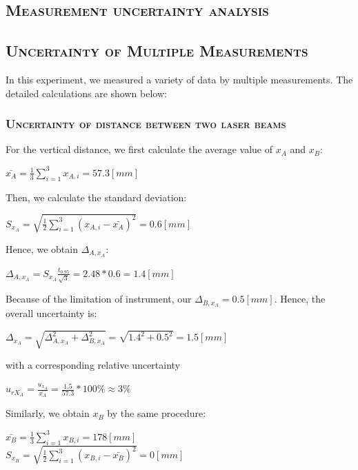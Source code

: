 \documentclass[a4paper,12pt]{article}
\begin{document}
\begin{appendices} 
      \section{\textsc{Measurement uncertainty analysis}} 
      \subsection{\textsc{Uncertainty of Multiple Measurements}}
      In this experiment, we measured a variety of data by multiple measurements. The detailed calculations are shown below:
      \subsubsection{\textsc{Uncertainty of distance between two laser beams}}
      For the vertical distance, we first calculate the average value of $x_{A}$ and $x_{B}$:
      \begin{center}
      $\displaystyle\bar{x_A} = \frac{1}{3}\sum_{i=1}^3x_{A,i} = 57.3 [mm]$
      \end{center}
      Then, we calculate the standard deviation:
      \begin{center}
      $\displaystyle S_{x_A} = \sqrt{\frac{1}{2}\sum_{i=1}^3(x_{A,i} - \bar{x_A})^2} = 0.6 [mm]$
      \end{center}
      Hence, we obtain $\Delta_{A,x_{A}}$:
      \begin{center}
      $\displaystyle\Delta_{A,x_A} = S_{x_A} \frac{t_{0.95}}{\sqrt{3}} = 2.48*0.6 = 1.4 [mm]$
      \end{center}
      Because of the limitation of instrument, our $\Delta_{B,x_A} = 0.5 [mm]$. Hence, the overall uncertainty is:
      \begin{center}
      $\Delta_{x_A} = \sqrt{\Delta_{A,x_A}^2 + \Delta_{B,x_A}^2} = \sqrt{1.4^2 + 0.5^2} = 1.5 [mm]$
      \end{center}
      with a corresponding relative uncertainty
      \begin{center}
      $\displaystyle u_{rX_A} = \frac{u_{x_A}}{\bar{x_A}} = \frac{1.5}{57.3}*100\% \approx 3\%$
      \end{center}
      \par Similarly, we obtain $x_B$ by the same procedure:
        \begin{center}
      $\displaystyle\bar{x_B} = \frac{1}{3}\sum_{i=1}^3x_{B,i} = 178 [mm]$ \\[2 mm]
      $\displaystyle S_{x_B} = \sqrt{\frac{1}{2}\sum_{i=1}^3(x_{B,i} - \bar{x_B})^2} = 0 [mm]$ \\[2 mm]

\end{center}
\end{appendices}
\end{document}
